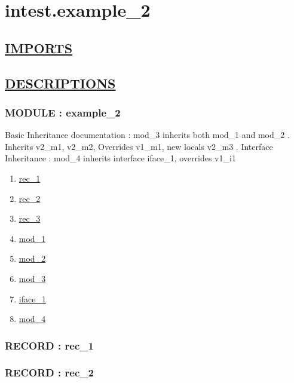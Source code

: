 \chapter*{intest.example\_2}

\section*{\underline{IMPORTS}}

\section*{\underline{DESCRIPTIONS}}
\subsection*{MODULE : example\_2}
\hypertarget{ecldoc:intest.example_2_intest.example_2}{}
Basic Inheritance documentation : mod\_3 inherits both mod\_1 and mod\_2 . Inherits v2\_m1, v2\_m2, Overrides v1\_m1, new locals v2\_m3 . Interface Inheritance : mod\_4 inherits interface iface\_1, overrides v1\_i1 \\
\begin{enumerate}
\item \hyperlink{ecldoc:intest.example_2_intest.example_2.rec_1}{rec\_1}
\item \hyperlink{ecldoc:intest.example_2_intest.example_2.rec_2}{rec\_2}
\item \hyperlink{ecldoc:intest.example_2_intest.example_2.rec_3}{rec\_3}
\item \hyperlink{ecldoc:intest.example_2_intest.example_2.mod_1}{mod\_1}
\item \hyperlink{ecldoc:intest.example_2_intest.example_2.mod_2}{mod\_2}
\item \hyperlink{ecldoc:intest.example_2_intest.example_2.mod_3}{mod\_3}
\item \hyperlink{ecldoc:intest.example_2_intest.example_2.iface_1}{iface\_1}
\item \hyperlink{ecldoc:intest.example_2_intest.example_2.mod_4}{mod\_4}
\end{enumerate}
\subsection*{RECORD : rec\_1}
\hypertarget{ecldoc:intest.example_2_intest.example_2.rec_1}{}
\subsection*{RECORD : rec\_2}
\hypertarget{ecldoc:intest.example_2_intest.example_2.rec_2}{}
